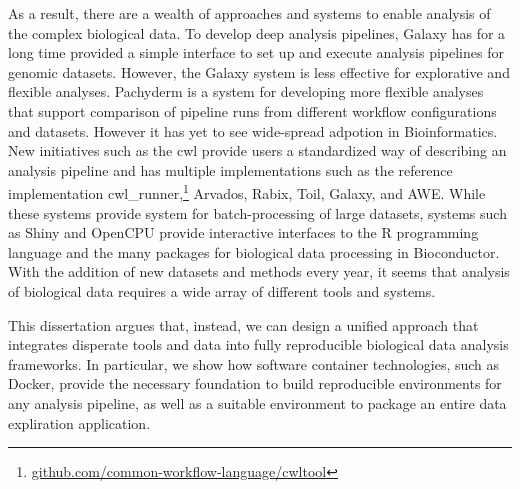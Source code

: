 As a result, there are a wealth of approaches and systems to enable analysis of
the complex biological data. To develop deep analysis pipelines,
Galaxy\cite{galaxy} has for a long time provided a simple interface to set up
and execute analysis pipelines for genomic datasets. 
However, the Galaxy system
is less effective for explorative and flexible
analyses.\cite{spjuth2015experiences} 
Pachyderm is a system for
developing more flexible analyses that support comparison of pipeline runs from
different workflow configurations and datasets.\cite{pachyderm} However it has
yet to see wide-spread adpotion in Bioinformatics.  
New initiatives such as the
\gls{cwl} provide users a standardized way of describing an analysis pipeline
and has multiple implementations such as the reference implementation
cwl\_runner,\footnote{\url{github.com/common-workflow-language/cwltool}}
Arvados,\cite{arvados} Rabix,\cite{rabix} Toil,\cite{toil} Galaxy,\cite{galaxy}
and AWE.\cite{awe} While these systems provide system for batch-processing of
large datasets, systems such as Shiny and OpenCPU provide interactive interfaces
to the R programming language and the many packages for biological data
processing in Bioconductor.  
With the addition of new datasets and methods every
year, it seems that analysis of biological data requires a wide array of
different tools and systems.

This dissertation argues that, instead, we can design a unified approach that
integrates disperate 
tools and data into fully reproducible biological data
analysis frameworks.  
In particular, we show how software container
technologies, 
such as Docker, provide the necessary foundation to build
reproducible environments for any analysis pipeline, as well as a suitable
environment to package an entire data expliration application. 

